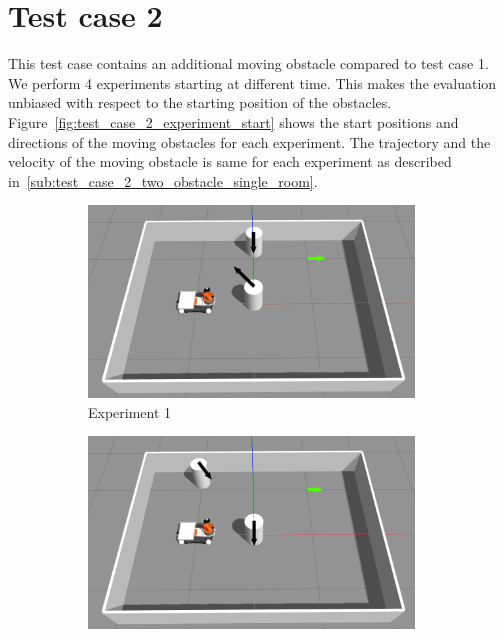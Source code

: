 \newpage{}
\section{Test case 2}%
\label{sec:test_case_2}

This test case contains an additional moving obstacle compared to test case 1. We perform 4 experiments 
starting at different time. This makes the evaluation unbiased with respect to
the starting position of the obstacles.  
Figure~\ref{fig:test_case_2_experiment_start} shows the start positions and directions of the moving
obstacles for each experiment. The trajectory and the velocity of the moving obstacle is same for each
experiment as described in~\ref{sub:test_case_2_two_obstacle_single_room}.

\begin{figure}[H]
    \centering
    \begin{subfigure}[b]{0.50\linewidth}
        \centering
        \includegraphics[width=0.95\textwidth]{images/test_case_2/exp1.png}
        \caption{Experiment 1}
    \end{subfigure}%
    \begin{subfigure}[b]{0.50\linewidth}
        \centering
        \includegraphics[width=0.95\textwidth]{images/test_case_2/exp2.png}

\end{subfigure}
\end{figure}
